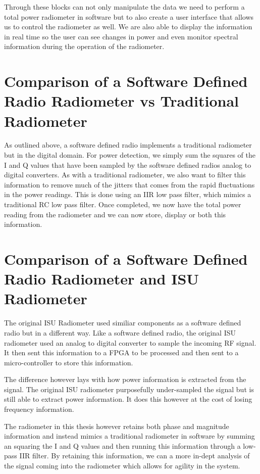 Through these blocks can not only manipulate the data we need to perform a total power radiometer in software but to also create a user interface that allows us to control the radiometer as well.  We are also able to display the information in real time so the user can see changes in power and even monitor spectral information during the operation of the radiometer. 

\section{Comparison of a Software Defined Radio Radiometer vs Traditional Radiometer}

As outlined above, a software defined radio implements a traditional radiometer but in the digital domain.  For power detection, we simply sum the squares of the I and Q values that have been sampled by the software defined radios analog to digital converters.  As with a traditional radiometer, we also want to filter this information to remove much of the jitters that comes from the rapid fluctuations in the power readings.  This is done using an IIR low pass filter, which mimics a traditional RC low pass filter.  Once completed, we now have the total power reading from the radiometer and we can now store, display or both this information.  

\section{Comparison of a Software Defined Radio Radiometer and ISU Radiometer}

The original ISU Radiometer used similiar components as a software defined radio but in a different way.  Like a software defined radio, the original ISU radiometer used an analog to digital converter to sample the incoming RF signal.  It then sent this information to a FPGA to be processed and then sent to a micro-controller to store this information.  

The difference however lays with how power information is extracted from the signal.  The original ISU radiometer purposefully under-sampled the signal but is still able to extract power information.  It does this however at the cost of losing frequency information.  

The radiometer in this thesis however retains both phase and magnitude information and instead mimics a traditional radiometer in software by summing an squaring the I and Q values and then running this information through a low-pass IIR filter.  By retaining this information, we can a more in-dept analysis of the signal coming into the radiometer which allows for agility in the system.